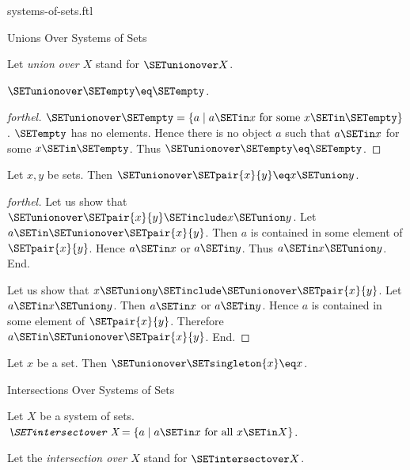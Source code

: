 \documentclass{naproche-library}
\begin{document}
\begin{smodule}[title=Systems of Sets]{systems-of-sets.ftl}
\begin{sfragment}{Unions Over Systems of Sets}
\begin{definition}[forthel,id=FOUNDATIONS_10_541772562300928]
    Let \emph{union over $X$} stand for $\SETunionover X$.
  \end{definition}

  \begin{proposition}[forthel,id=FOUNDATIONS_10_4872701241982976]
    $\SETunionover \SETempty \eq \SETempty$.
  \end{proposition}
  \begin{proof}[forthel]
    $\SETunionover \SETempty = \{ a \mid a \SETin x\text{ for some }x \SETin \SETempty \}$.
    $\SETempty$ has no elements.
    Hence there is no object $a$ such that $a \SETin x$ for some $x \SETin \SETempty$.
    Thus $\SETunionover \SETempty \eq \SETempty$.
  \end{proof}

  \begin{proposition}[forthel,id=FOUNDATIONS_10_2559541585641472]
    Let $x, y$ be sets.
    Then $\SETunionover \SETpair{x}{y} \eq x \SETunion y$.
  \end{proposition}
  \begin{proof}[forthel]
    Let us show that $\SETunionover \SETpair{x}{y} \SETinclude x \SETunion y$.
      Let $a \SETin \SETunionover \SETpair{x}{y}$.
      Then $a$ is contained in some element of $\SETpair{x}{y}$.
      Hence $a \SETin x$ or $a \SETin y$.
      Thus $a \SETin x \SETunion y$.
    End.

    Let us show that $x \SETunion y \SETinclude \SETunionover \SETpair{x}{y}$.
      Let $a \SETin x \SETunion y$.
      Then $a \SETin x$ or $a \SETin y$.
      Hence $a$ is contained in some element of $\SETpair{x}{y}$.
      Therefore $a \SETin \SETunionover \SETpair{x}{y}$.
    End.
  \end{proof}

  \begin{corollary}[forthel,id=FOUNDATIONS_10_2157223832715264]
    Let $x$ be a set.
    Then $\SETunionover \SETsingleton{x} \eq x$.
  \end{corollary}
\end{sfragment}

\begin{sfragment}{Intersections Over Systems of Sets}
  \begin{definition}[forthel,id=FOUNDATIONS_10_2659345095458816]
    Let $X$ be a system of sets.
    $\emph{\SETintersectover X} = \{ a \mid a \SETin x\text{ for all }x \SETin X \}$.

    Let the \emph{intersection over $X$} stand for $\SETintersectover X$.
  \end{definition}


\end{sfragment}
\end{smodule}
\end{document}
